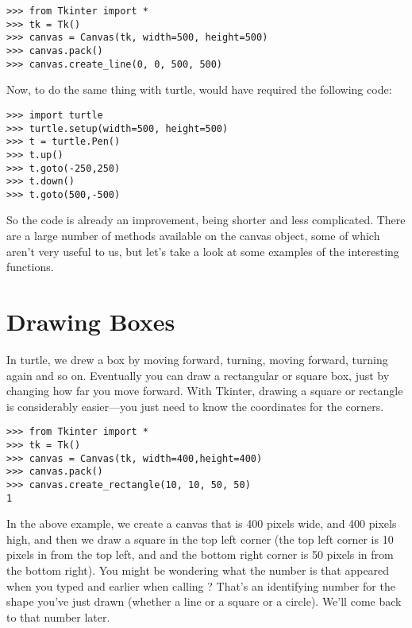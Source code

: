 \begin{listing}
\begin{verbatim}
>>> from Tkinter import *
>>> tk = Tk()
>>> canvas = Canvas(tk, width=500, height=500)
>>> canvas.pack()
>>> canvas.create_line(0, 0, 500, 500)
\end{verbatim}
\end{listing}

\noindent
Now, to do the same thing with turtle, would have required the following code:

\begin{listing}
\begin{verbatim}
>>> import turtle
>>> turtle.setup(width=500, height=500)
>>> t = turtle.Pen()
>>> t.up()
>>> t.goto(-250,250)
>>> t.down()
>>> t.goto(500,-500)
\end{verbatim}
\end{listing}

So the  code is already an improvement, being shorter and less complicated. There are a large number of methods available on the canvas object, some of which aren't very useful to us, but let's take a look at some examples of the interesting functions.

\section{Drawing Boxes}

In turtle, we drew a box by moving forward, turning, moving forward, turning again and so on. Eventually you can draw a rectangular or square box, just by changing how far you move forward. With Tkinter, drawing a square or rectangle is considerably easier---you just need to know the coordinates for the corners.

\begin{listingignore}
\begin{verbatim}
>>> from Tkinter import *
>>> tk = Tk()
>>> canvas = Canvas(tk, width=400,height=400)
>>> canvas.pack()
>>> canvas.create_rectangle(10, 10, 50, 50)
1
\end{verbatim}
\end{listingignore}

In the above example, we create a canvas that is 400 pixels wide, and 400 pixels high, and then we draw a square in the top left corner (the top left corner is 10 pixels in from the top left, and and the bottom right corner is 50 pixels in from the bottom right). You might be wondering what the number is that appeared when you typed  and earlier when calling ?  That's an identifying number for the shape you've just drawn (whether a line or a square or a circle). We'll come back to that number later.

